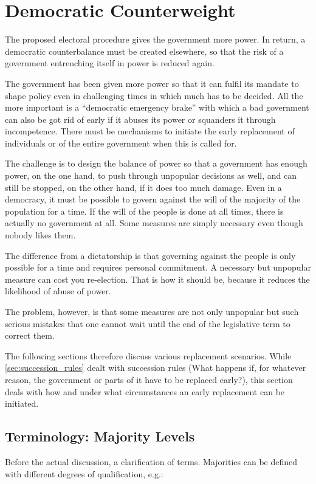 \section{Democratic Counterweight} \label{sec:democratic_counterweight}
The proposed electoral procedure gives the government more power.
In return, a democratic counterbalance must be created elsewhere, so that the risk of a government entrenching itself in power is reduced again.

The government has been given more power so that it can fulfil its mandate to shape policy even in challenging times in which much has to be decided.
All the more important is a \enquote{democratic emergency brake} with which a bad government can also be got rid of early if it abuses its power or squanders it through incompetence.
There must be mechanisms to initiate the early replacement of individuals or of the entire government when this is called for.

The challenge is to design the balance of power so that a government has enough power, on the one hand, to push through unpopular decisions as well, and can still be stopped, on the other hand, if it does too much damage.
Even in a democracy, it must be possible to govern against the will of the majority of the population for a time.
If the will of the people is done at all times, there is actually no government at all.
Some measures are simply necessary even though nobody likes them.

The difference from a dictatorship is that governing against the people is only possible for a time and requires personal commitment.
A necessary but unpopular measure can cost you re-election.
That is how it should be, because it reduces the likelihood of abuse of power.

The problem, however, is that some measures are not only unpopular but such serious mistakes that one cannot wait until the end of the legislative term to correct them.

The following sections therefore discuss various replacement scenarios.
While \cref{sec:succession_rules} dealt with succession rules (What happens if, for whatever reason, the government or parts of it have to be replaced early?),
this section deals with how and under what circumstances an early replacement can be initiated.

\subsection{Terminology: Majority Levels} \label{subsec:majority_levels}
Before the actual discussion, a clarification of terms.
Majorities can be defined with different degrees of qualification, e.g.:

